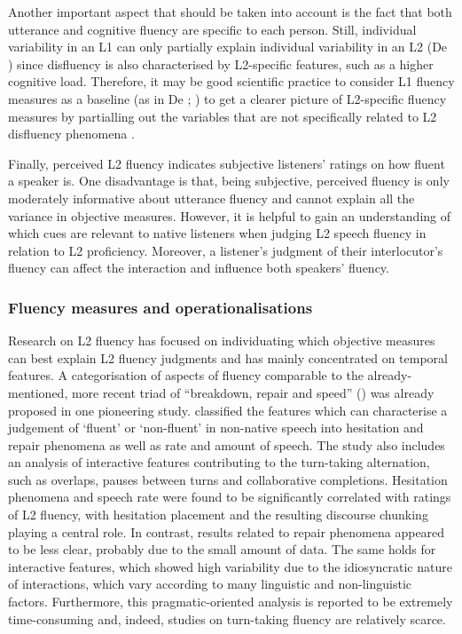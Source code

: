 Another important aspect that should be taken into account is the fact that both utterance and cognitive fluency are specific to each person. Still, individual variability in an L1 can only partially explain individual variability in an L2 (De \citealt{JongEtAl2013}) since disfluency is also characterised by L2-specific features, such as a higher cognitive load. Therefore, it may be good scientific practice to consider L1 fluency measures as a baseline (as in De \citealt{JongEtAl2015}; \citealt{SaitoEtAl2018}) to get a clearer picture of L2-specific fluency measures by partialling out the variables that are not specifically related to L2 disfluency phenomena \citep{Segalowitz2010}.

Finally, perceived L2 fluency indicates subjective listeners’ ratings on how fluent a speaker is. One disadvantage is that, being subjective, perceived fluency is only moderately informative about utterance fluency and cannot explain all the variance in objective measures. However, it is helpful to gain an understanding of which cues are relevant to native listeners when judging L2 speech fluency in relation to L2 proficiency. Moreover, a listener’s judgment of their interlocutor’s fluency can affect the interaction and influence both speakers’ fluency.

\subsubsection{Fluency measures and operationalisations}
\hypertarget{Toc191305927}{}
Research on L2 fluency has focused on individuating which objective measures can best explain L2 fluency judgments and has mainly concentrated on temporal features. A categorisation of aspects of fluency comparable to the already-mentioned, more recent triad of “breakdown, repair and speed” (\citealt{TavakoliSkehan2005}) was already proposed in one pioneering study. \citet{Riggenbach1991} classified the features which can characterise a judgement of ‘fluent’ or ‘non-fluent’ in non-native speech into hesitation and repair phenomena as well as rate and amount of speech. The study also includes an analysis of interactive features contributing to the turn-taking alternation, such as overlaps, pauses between turns and collaborative completions. Hesitation phenomena and speech rate were found to be significantly correlated with ratings of L2 fluency, with hesitation placement and the resulting discourse chunking playing a central role. In contrast, results related to repair phenomena appeared to be less clear, probably due to the small amount of data. The same holds for interactive features, which showed high variability due to the idiosyncratic nature of interactions, which vary according to many linguistic and non-linguistic factors. Furthermore, this pragmatic-oriented analysis is reported to be extremely time-consuming and, indeed, studies on turn-taking fluency are relatively scarce.

